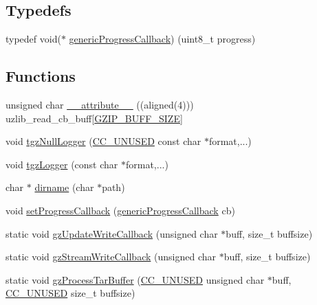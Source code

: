 \subsection*{Typedefs}
\begin{DoxyCompactItemize}
\item 
typedef void($\ast$ \hyperlink{ESP32-targz_8cpp_ac5ee8ab247efd1a402991d9cb253f501}{generic\+Progress\+Callback}) (uint8\+\_\+t progress)
\end{DoxyCompactItemize}
\subsection*{Functions}
\begin{DoxyCompactItemize}
\item 
unsigned char \hyperlink{ESP32-targz_8cpp_a12d54f14711605460bd2f058babeb57a}{\+\_\+\+\_\+attribute\+\_\+\+\_\+} ((aligned(4))) uzlib\+\_\+read\+\_\+cb\+\_\+buff\mbox{[}\hyperlink{ESP32-targz_8cpp_ab570e96e8879b39cfc62a83a131ac42c}{G\+Z\+I\+P\+\_\+\+B\+U\+F\+F\+\_\+\+S\+I\+ZE}\mbox{]}
\item 
void \hyperlink{ESP32-targz_8cpp_a400945a5fabb73ac04f71adeb91ff2d0}{tgz\+Null\+Logger} (\hyperlink{ESP32-targz_8cpp_a88f6b33e1b3dd06a431809c0b41fccfa}{C\+C\+\_\+\+U\+N\+U\+S\+ED} const char $\ast$format,...)
\item 
void \hyperlink{ESP32-targz_8cpp_ad32e306d98722d52047607bdaf5d0f70}{tgz\+Logger} (const char $\ast$format,...)
\item 
char $\ast$ \hyperlink{ESP32-targz_8cpp_ab1b6028f4625caec30c1020e737216e2}{dirname} (char $\ast$path)
\item 
void \hyperlink{ESP32-targz_8cpp_a24933a26ee91633c9b2b436839374476}{set\+Progress\+Callback} (\hyperlink{ESP32-targz_8cpp_ac5ee8ab247efd1a402991d9cb253f501}{generic\+Progress\+Callback} cb)
\item 
static void \hyperlink{ESP32-targz_8cpp_ac282c18be6cf758f65db71e84a3ec1ba}{gz\+Update\+Write\+Callback} (unsigned char $\ast$buff, size\+\_\+t buffsize)
\item 
static void \hyperlink{ESP32-targz_8cpp_ad38734ad3c99f03481d41c1636176674}{gz\+Stream\+Write\+Callback} (unsigned char $\ast$buff, size\+\_\+t buffsize)
\item 
static void \hyperlink{ESP32-targz_8cpp_ab36b675cf70737c74f3a4ec541656933}{gz\+Process\+Tar\+Buffer} (\hyperlink{ESP32-targz_8cpp_a88f6b33e1b3dd06a431809c0b41fccfa}{C\+C\+\_\+\+U\+N\+U\+S\+ED} unsigned char $\ast$buff, \hyperlink{ESP32-targz_8cpp_a88f6b33e1b3dd06a431809c0b41fccfa}{C\+C\+\_\+\+U\+N\+U\+S\+ED} size\+\_\+t buffsize)

\end{DoxyCompactItemize}
